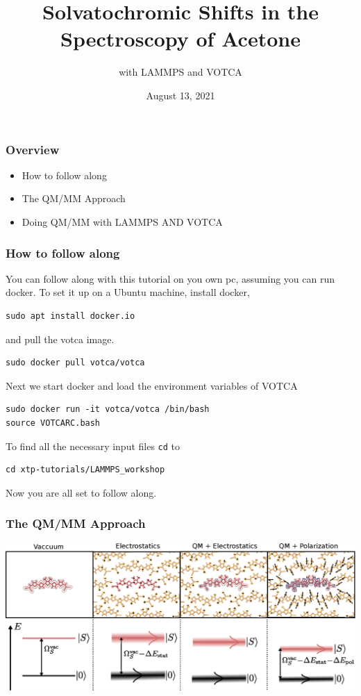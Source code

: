 \documentclass[t,aspectratio=169, 8pt]{beamer}
\title{Solvatochromic Shifts in the Spectroscopy of Acetone}
\subtitle{\Large with LAMMPS and VOTCA}
\author{August 13, 2021}
\begin{document}
\begin{titleframe}[variant=1,bgimage=background.png]
\end{titleframe}

\begin{chapterframe}
  \frametitle{Overview}
  \begin{itemize}
    \item How to follow along
    \item The QM/MM Approach
    \item Doing QM/MM with LAMMPS AND VOTCA
  \end{itemize}
\end{chapterframe}



\begin{frame}[fragile]
  \frametitle{How to follow along}
  You can follow along with this tutorial on you own pc, assuming you can run docker. To set it up on a Ubuntu machine, install docker,
  \begin{verbatim}
sudo apt install docker.io
  \end{verbatim}
  and pull the votca image.
  \begin{verbatim}
sudo docker pull votca/votca
  \end{verbatim}
  Next we start docker and load the environment variables of VOTCA
  \begin{verbatim}
sudo docker run -it votca/votca /bin/bash
source VOTCARC.bash
  \end{verbatim}
  To find all the necessary input files \texttt{cd} to
  \begin{verbatim}
cd xtp-tutorials/LAMMPS_workshop
\end{verbatim}
  Now you are all set to follow along.

\end{frame}


\begin{frame}
  \frametitle{The QM/MM Approach}
  \centering
  \includegraphics[height=0.65\textheight]{images/siteenergies}
\end{frame}
\end{document}
